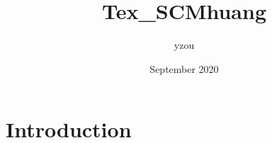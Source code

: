 \documentclass{article}
\title{Tex_SCMhuang}
\author{yzou }
\date{September 2020}
\begin{document}
\maketitle

\section{Introduction}
\end{document}
